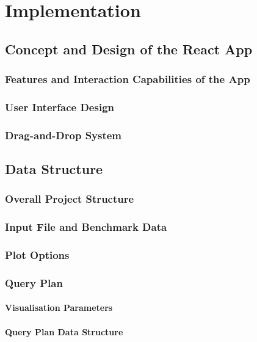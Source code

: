 
\chapter{Implementation}\label{chapter:implementation}

\section{Concept and Design of the React App}
\subsection{Features and Interaction Capabilities of the App}
\subsection{User Interface Design}
\subsection{Drag-and-Drop System}

\section{Data Structure}
\subsection{Overall Project Structure}
\subsection{Input File and Benchmark Data}
\subsection{Plot Options}
\subsection{Query Plan}
\subsubsection{Visualisation Parameters}
\subsubsection{Query Plan Data Structure}

